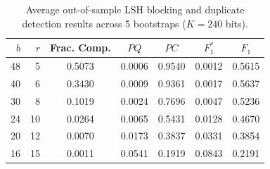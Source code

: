 \begin{table}[t]
\centering
\caption{Average out-of-sample LSH blocking and duplicate detection results across 5 bootstraps ($K=240$ bits).}
\label{tab:results}
\begin{tabular}{rrccccc}
\hline
$b$ & $r$ & Frac. Comp. & $PQ$ & $PC$ & $F_1^*$ & $F_1$ \\
\hline
48 & 5 & 0.5073 & 0.0006 & 0.9540 & 0.0012 & 0.5615 \\
40 & 6 & 0.3430 & 0.0009 & 0.9361 & 0.0017 & 0.5637 \\
30 & 8 & 0.1019 & 0.0024 & 0.7696 & 0.0047 & 0.5236 \\
24 & 10 & 0.0264 & 0.0065 & 0.5431 & 0.0128 & 0.4670 \\
20 & 12 & 0.0070 & 0.0173 & 0.3837 & 0.0331 & 0.3854 \\
16 & 15 & 0.0011 & 0.0541 & 0.1919 & 0.0843 & 0.2191 \\
\hline
\end{tabular}
\end{table}
